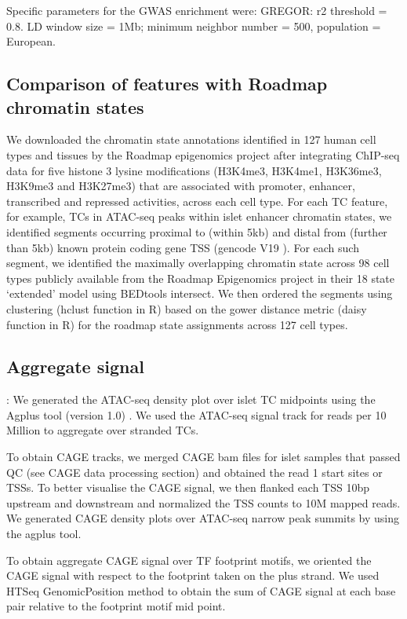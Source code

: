 Specific parameters for the GWAS enrichment were: GREGOR: r2 threshold = 0.8. LD window size = 1Mb; minimum neighbor number = 500, population = European.
         
\subsection{Comparison of features with Roadmap chromatin states}
We downloaded the chromatin state annotations identified in 127 human cell types and tissues by the Roadmap epigenomics project \cite{consortiumIntegrativeAnalysis1112015} after integrating ChIP-seq data for five histone 3 lysine modifications (H3K4me3, H3K4me1, H3K36me3, H3K9me3 and H3K27me3) that are associated with promoter, enhancer, transcribed and repressed activities, across each cell type. For each TC feature, for example, TCs in ATAC-seq peaks within islet enhancer chromatin states, we identified segments occurring proximal to (within 5kb) and distal from (further than 5kb) known protein coding gene TSS (gencode V19 \cite{harrowGENCODEReferenceHuman2012}). For each such segment, we identified the maximally overlapping chromatin state across 98 cell types publicly available from the Roadmap Epigenomics project in their 18 state ‘extended’ model using BEDtools intersect. We then ordered the segments using clustering (hclust function in R) based on the gower distance metric (daisy function in R) for the roadmap state assignments across 127 cell types.


\subsection{Aggregate signal}:
We generated the ATAC-seq density plot over islet TC midpoints using the Agplus tool (version 1.0) \cite{maeharaAgplusRapidFlexible2015}. We used the ATAC-seq signal track for reads per 10 Million to aggregate over stranded TCs. 


To obtain CAGE tracks, we merged CAGE bam files for islet samples that passed QC (see CAGE data processing section) and obtained the read 1 start sites or TSSs. To better visualise the CAGE signal, we then flanked each TSS 10bp upstream and downstream and normalized the TSS counts to 10M mapped reads.   We generated CAGE density plots over ATAC-seq narrow peak summits by using the agplus tool.  

To obtain aggregate CAGE signal over TF footprint motifs, we oriented the CAGE signal with respect to the footprint taken on the plus strand. We used HTSeq GenomicPosition method \cite{andersHTSeqPythonFramework2015} to obtain the sum of CAGE signal at each base pair relative to the footprint motif mid point.


